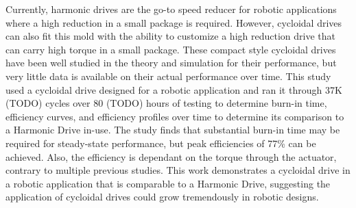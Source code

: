 Currently, harmonic drives are the go-to speed reducer for robotic applications where a high reduction in a small package is required. However, cycloidal drives can also fit this mold with the ability to customize a high reduction drive that can carry high torque in a small package. These compact style cycloidal drives have been well studied in the theory and simulation for their performance, but very little data is available on their actual performance over time. This study used a cycloidal drive designed for a robotic application and ran it through 37K (TODO) cycles over 80 (TODO) hours of testing to determine burn-in time, efficiency curves, and efficiency profiles over time to determine its comparison to a Harmonic Drive in-use. The study finds that substantial burn-in time may be required for steady-state performance, but peak efficiencies of 77\% can be achieved. Also, the efficiency is dependant on the torque through the actuator, contrary to multiple previous studies. This work demonstrates a cycloidal drive in a robotic application that is comparable to a Harmonic Drive, suggesting the application of cycloidal drives could grow tremendously in robotic designs. 